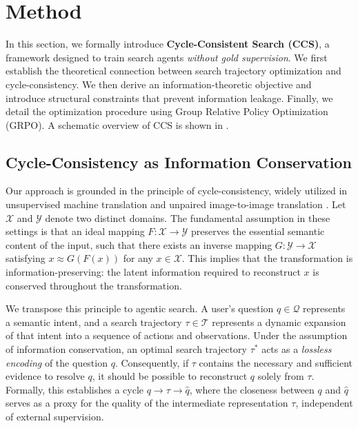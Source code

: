 


\section{Method}
In this section, we formally introduce \textbf{Cycle-Consistent Search (CCS)}, a framework designed to train search agents \emph{without gold supervision}. We first establish the theoretical connection between search trajectory optimization and cycle-consistency. We then derive an information-theoretic objective and introduce structural constraints that prevent information leakage. Finally, we detail the optimization procedure using Group Relative Policy Optimization (GRPO). A schematic overview of CCS is shown in .

\subsection{Cycle-Consistency as Information Conservation}
\label{sec:cycle-consistency}
Our approach is grounded in the principle of cycle-consistency, widely utilized in unsupervised machine translation \citep{he2016dual, lample2017unsupervised, han2021unsupervised} and unpaired image-to-image translation \citep{cyclegan, liu2017unsupervised, huang2018multimodal}. Let $\mathcal{X}$ and $\mathcal{Y}$ denote two distinct domains. The fundamental assumption in these settings is that an ideal mapping $F: \mathcal{X}\rightarrow \mathcal{Y}$ preserves the essential semantic content of the input, such that there exists an inverse mapping $G:\mathcal{Y}\rightarrow \mathcal{X}$ satisfying $x \approx G(F(x))$ for any $x\in\mathcal{X}$. This implies that the transformation is information-preserving: the latent information required to reconstruct $x$ is conserved throughout the transformation.

We transpose this principle to agentic search. A user's question $q\in\mathcal{Q}$ represents a semantic intent, and a search trajectory $\tau\in\mathcal{T}$ represents a dynamic expansion of that intent into a sequence of actions and observations. Under the assumption of information conservation, an optimal search trajectory $\tau^*$ acts as a \emph{lossless encoding} of the question $q$. Consequently, if $\tau$ contains the necessary and sufficient evidence to resolve $q$, it should be possible to reconstruct $q$ solely from $\tau$. Formally, this establishes a cycle $q \rightarrow \tau \rightarrow \hat{q}$, where the closeness between $q$ and $\hat{q}$ serves as a proxy for the quality of the intermediate representation $\tau$, independent of external supervision.

